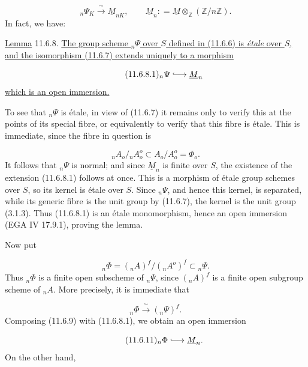 \begin{equation}\tag{11.6.7}
{}_n\Psi_K\xrightarrow{\ \sim\ }\underline M_{nK},
\qquad
\underline M_n\mathrel{\mathop:}=\underline M
 \otimes_{\mathbb Z}(\mathbb Z/n\mathbb Z).
\end{equation}
In fact, we have:

\medskip
\noindent
\underline{Lemma} 11.6.8. \underline{The group scheme ${}_n\Psi$ over
$S$ defined in (11.6.6) is \emph{\'etale} over $S$, and the isomorphism
(11.6.7) extends uniquely to a morphism}

\begin{equation}\tag{11.6.8.1}
{}_n\Psi\lhook\joinrel\longrightarrow\underline M_n
\end{equation}
\underline{which is an open immersion.}

To see that ${}_n\Psi$ is \'etale, in view of (11.6.7) it remains only
to verify this at the points of its special fibre, or equivalently to
verify that this fibre is \'etale. This is immediate, since the fibre in
question is

\begin{equation*}
{}_nA_o/{}_nA_o^o\subset A_o/A_o^o=\Phi_o.
\end{equation*}
It follows that ${}_n\Psi$ is normal; and since $\underline M_n$ is
finite over $S$, the existence of the extension (11.6.8.1) follows at
once. This is a morphism of \'etale group schemes over $S$, so its
kernel is \'etale over $S$. Since ${}_n\Psi$, and hence this kernel, is
separated, while its generic fibre is the unit group by (11.6.7), the
kernel is the unit group (3.1.3). Thus (11.6.8.1) is an \'etale
monomorphism, hence an open immersion (EGA IV 17.9.1), proving the lemma.

Now put

\begin{equation}\tag{11.6.9}
{}_n\Phi=({}_nA)^f/({}_nA^o)^f\subset{}_n\Psi.
\end{equation}
Thus ${}_n\Phi$ is a finite open subscheme of ${}_n\Psi$, since
$({}_nA)^f$ is a finite open subgroup scheme of ${}_nA$. More
precisely, it is immediate that

\begin{equation}\tag{11.6.10}
{}_n\Phi\xrightarrow{\ \sim\ }({}_n\Psi)^f.
\end{equation}
Composing (11.6.9) with (11.6.8.1), we obtain an open immersion

\begin{equation}\tag{11.6.11}
{}_n\Phi\lhook\joinrel\longrightarrow\underline M_n.
\end{equation}
On the other hand,

